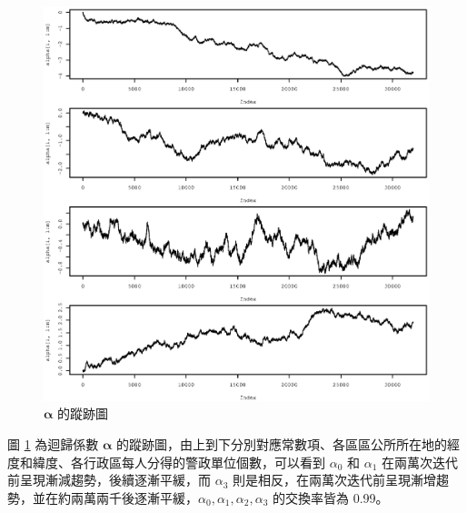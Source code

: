 \documentclass[12pt,a4paper]{article}
\begin{document}
\begin{CJK}{UTF8}{bkai}
\begin{figure}[H]
\centering
\includegraphics[width=1\textwidth]{alpha_traceplot.eps}
\caption{$\bm{\alpha}$ 的蹤跡圖}
\label{Fig.main4}
\end{figure}
圖  \ref{Fig.main4} 為迴歸係數 $\bm{\alpha}$ 的蹤跡圖，由上到下分別對應常數項、各區區公所所在地的經度和緯度、各行政區每人分得的警政單位個數，可以看到 $\alpha_0$ 和 $\alpha_1$ 在兩萬次迭代前呈現漸減趨勢，後續逐漸平緩，而 $\alpha_3$ 則是相反，在兩萬次迭代前呈現漸增趨勢，並在約兩萬兩千後逐漸平緩，$\alpha_0,\alpha_1,\alpha_2,\alpha_3$ 的交換率皆為 0.99。


\end{CJK}
\end{document}
